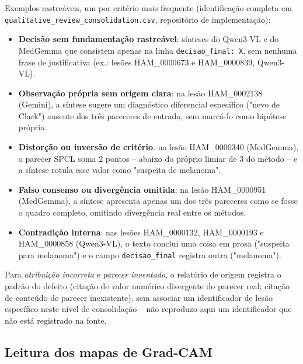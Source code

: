 Exemplos rastreáveis, um por critério mais frequente (identificação completa em \texttt{qualitative\_review\_consolidation.csv}, repositório de implementação):
\begin{itemize}
	\item \textbf{Decisão sem fundamentação rastreável}: sínteses do Qwen3-VL e do MedGemma que consistem apenas na linha \texttt{decisao\_final: X}, sem nenhuma frase de justificativa (ex.: lesões HAM\_0000673 e HAM\_0000839, Qwen3-VL).
	\item \textbf{Observação própria sem origem clara}: na lesão HAM\_0002138 (Gemini), a síntese sugere um diagnóstico diferencial específico ("nevo de Clark") ausente dos três pareceres de entrada, sem marcá-lo como hipótese própria.
	\item \textbf{Distorção ou inversão de critério}: na lesão HAM\_0000340 (MedGemma), o parecer SPCL soma 2 pontos -- abaixo do próprio limiar de 3 do método -- e a síntese rotula esse valor como "suspeita de melanoma".
	\item \textbf{Falso consenso ou divergência omitida}: na lesão HAM\_0000951 (MedGemma), a síntese apresenta apenas um dos três pareceres como se fosse o quadro completo, omitindo divergência real entre os métodos.
	\item \textbf{Contradição interna}: nas lesões HAM\_0000132, HAM\_0000193 e HAM\_0000858 (Qwen3-VL), o texto conclui uma coisa em prosa ("suspeita para melanoma") e o campo \texttt{decisao\_final} registra outra ("melanoma").
\end{itemize}
Para \textit{atribuição incorreta} e \textit{parecer inventado}, o relatório de origem registra o padrão do defeito (citação de valor numérico divergente do parecer real; citação de conteúdo de parecer inexistente), sem associar um identificador de lesão específico neste nível de consolidação -- não reproduzo aqui um identificador que não está registrado na fonte.

\subsection{Leitura dos mapas de Grad-CAM}
\label{sec:resultados_gradcam}

